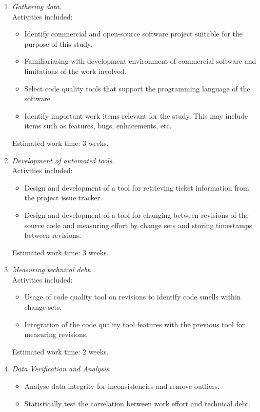 \documentclass{mprop}
\begin{document}
\begin{enumerate}
	\item \textit{Gathering data}.\\
	Activities included:
	\begin{itemize}
		\item Identify commercial and open-source software project suitable for
		the purpose of this study.
		\item Familiariasing with development environment of commercial software
		and limitations of the work involved.
		\item Select code quality tools that support the programming language of
		the software.
		\item Identify important work items relevant for the study. This may
		include items such as features, bugs, enhacements, etc.
	\end{itemize}

	Estimated work time: 3 weeks.\\
	
	\item \textit{Development of automated tools}.\\
	Activities included:
	\begin{itemize}
		\item Design and development of a tool for retrieving ticket information
		from the project issue tracker.
		\item Design and development of a tool for changing between revisions of
		the source code and measuring effort by change sets and storing
		timestamps between revisions.
	\end{itemize}

	Estimated work time: 3 weeks.\\

	\item \textit{Measuring technical debt}.\\
	Activities included:
	\begin{itemize}
		\item Usage of code quality tool on revisions to identify code smells
		within change sets.
		\item Integration of the code quality tool features with the previous
		tool for measuring revisions.
	\end{itemize}

	Estimated work time: 2 weeks.\\

	\item \textit{Data Verification and Analysis}.\\
	\begin{itemize}
		\item Analyse data integrity for inconsistencies and remove outliers.
		\item Statistically test the correlation between work effort and technical debt.
	\end{itemize}


\end{enumerate}
\end{document}
